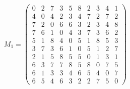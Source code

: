 \begin{equation}
	\label{eq:kd1}
	M_{1} = \begin{pmatrix}
		0& 2& 7& 3& 5& 8& 2& 3& 4& 1 \\
		4& 0& 4& 2& 3& 4& 7& 2& 7& 2 \\
		7& 2& 0& 6& 6& 3& 2& 3& 4& 8 \\
		7& 6& 1& 0& 4& 3& 7& 3& 6& 2 \\
		5& 1& 8& 4& 0& 5& 1& 8& 5& 3 \\
		3& 7& 3& 6& 1& 0& 5& 1& 2& 7 \\
		2& 1& 5& 8& 5& 5& 0& 1& 3& 1 \\
		6& 3& 7& 7& 8& 5& 8& 0& 7& 5 \\
		6& 1& 3& 3& 4& 6& 5& 4& 0& 7 \\
		6& 5& 4& 6& 3& 2& 2& 7& 5& 0 
		
	\end{pmatrix}
\end{equation}

